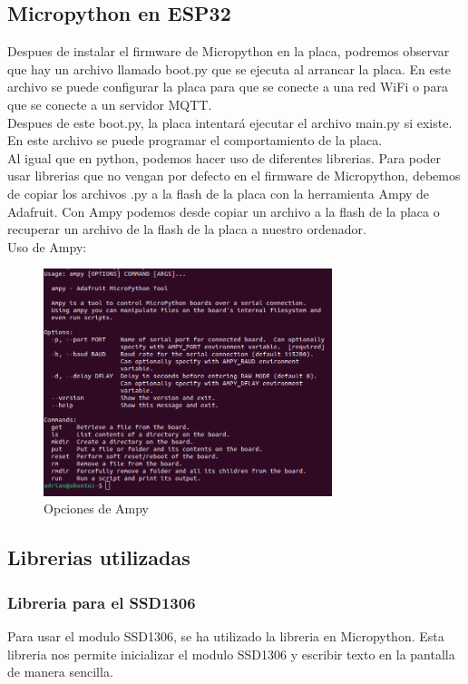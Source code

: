 \begin{titlepage}
\subsection{Micropython en ESP32}
Despues de instalar el firmware de Micropython en la placa, podremos observar que hay un archivo llamado boot.py que se ejecuta al arrancar la placa. En este archivo se puede configurar la placa para que se conecte a una red WiFi o para que se conecte a un servidor MQTT.\\
Despues de este boot.py, la placa intentará ejecutar el archivo main.py si existe. En este archivo se puede programar el comportamiento de la placa.\\

Al igual que en python, podemos hacer uso de diferentes librerias. Para poder usar librerias que no vengan por defecto en el firmware de Micropython, debemos de copiar los archivos .py a la flash de la placa con la herramienta Ampy de Adafruit\cite{ref20}. Con Ampy podemos desde copiar un archivo a la flash de la placa o recuperar un archivo de la flash de la placa a nuestro ordenador. \\
Uso de Ampy:
\begin{figure}[h!]
	\centering
	\includegraphics[width=0.75\textwidth]{imagenes/ampy.png}
	\caption{Opciones de Ampy}
\end{figure}
\subsection{Librerias utilizadas}
\subsubsection{Libreria para el SSD1306}
Para usar el modulo SSD1306, se ha utilizado la libreria \cite{ref21} en Micropython. Esta libreria nos permite inicializar el modulo SSD1306 y escribir texto en la pantalla de manera sencilla.\\

\end{titlepage}
